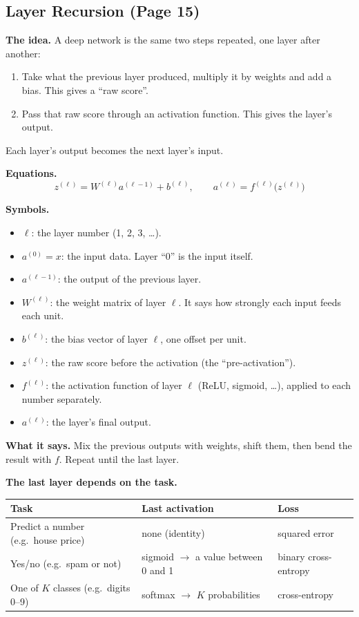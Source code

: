 \subsection*{Layer Recursion (Page 15)}

\textbf{The idea.} A deep network is the same two steps repeated, one layer after another:
\begin{enumerate}
  \item Take what the previous layer produced, multiply it by weights and add a bias. This gives a ``raw score''.
  \item Pass that raw score through an activation function. This gives the layer's output.
\end{enumerate}
Each layer's output becomes the next layer's input.

\textbf{Equations.}
\[
z^{(\ell)} = W^{(\ell)} a^{(\ell-1)} + b^{(\ell)}, \qquad a^{(\ell)} = f^{(\ell)}\big(z^{(\ell)}\big)
\]

\textbf{Symbols.}
\begin{itemize}
  \item $\ell$: the layer number (1, 2, 3, \dots).
  \item $a^{(0)} = x$: the input data. Layer ``0'' is the input itself.
  \item $a^{(\ell-1)}$: the output of the previous layer.
  \item $W^{(\ell)}$: the weight matrix of layer $\ell$. It says how strongly each input feeds each unit.
  \item $b^{(\ell)}$: the bias vector of layer $\ell$, one offset per unit.
  \item $z^{(\ell)}$: the raw score before the activation (the ``pre-activation'').
  \item $f^{(\ell)}$: the activation function of layer $\ell$ (ReLU, sigmoid, \dots), applied to each number separately.
  \item $a^{(\ell)}$: the layer's final output.
\end{itemize}

\textbf{What it says.} Mix the previous outputs with weights, shift them, then bend the result with $f$. Repeat until the last layer.

\textbf{The last layer depends on the task.}

\begin{tabular}{lll}
\toprule
Task & Last activation & Loss \\
\midrule
Predict a number (e.g.\ house price) & none (identity) & squared error \\
Yes/no (e.g.\ spam or not) & sigmoid $\to$ a value between 0 and 1 & binary cross-entropy \\
One of $K$ classes (e.g.\ digits 0--9) & softmax $\to$ $K$ probabilities & cross-entropy \\
\bottomrule
\end{tabular}

